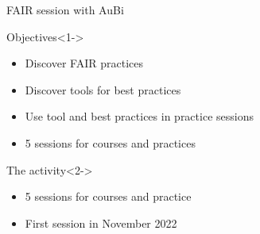 \begin{frame}{FAIR session with AuBi}

\begin{block}{Objectives}<1->
\begin{itemize}
\item Discover FAIR practices
\item Discover tools for best practices
\item Use tool and best practices in practice sessions
\item 5 sessions for courses and practices
\end{itemize}
\end{block}

\begin{block}{The activity}<2->
\begin{itemize}
\item 5 sessions for courses and practice
\item First session in November 2022
\end{itemize}
\end{block}
\end{frame}

